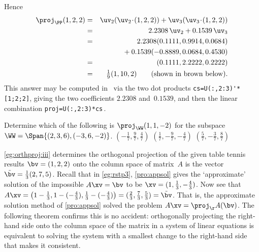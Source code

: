\begin{example}
\begin{enumerate}
\begin{solution}
\begin{center}\end{center}
Hence
\begin{eqnarray*}
\proj_\PP(1,2,2)
&=&\uv_2(\uv_2\cdot(1,2,2))+\uv_3(\uv_3\cdot(1,2,2))
\\&=&2.2308\,\uv_2+0.1539\,\uv_3
\\&=&2.2308(0.1111,0.9914,0.0684)
\\&&{}+0.1539(-0.8889,0.0684,0.4530)
\\&=&(0.1111,2.2222,0.2222)
\\&=&\tfrac19(1,10,2)
\qquad(\text{shown in brown below}).
\end{eqnarray*}
This answer may be computed in \script\ via the two dot products \verb|cs=U(:,2:3)'*[1;2;2]|, giving the two coefficients \(2.2308\) and~\(0.1539\), and then the linear combination \verb|proj=U(:,2:3)*cs|\,.
\begin{center}\end{center}
\end{solution}
\end{enumerate}
\end{example}



\begin{activity}
Determine which of the following is \(\proj_\WW(1,1,-2)\) for the subspace \(\WW=\Span\{(2,3,6), (-3,6,-2)\}\).
{\((-\frac17,\frac97,\frac47)\)}
{\((\frac17,-\frac97,-\frac47)\)}
{\((\frac57,-\frac37,\frac87)\)}
\end{activity}




\autoref{eg:orthproj:iii} determines the orthogonal projection of the given table tennis results \(\bv=(1,2,2)\) onto the column space of matrix~\(A\) is the vector \(\tilde\bv=\tfrac13(2,7,5)\).
Recall that in \autoref{eg:rstp3}, \autoref{pro:appsol} gives the `approximate' solution of the impossible \(A\xv=\bv\) to be \(\xv=(1,\frac13,-\frac43)\).
Now see that \(A\xv
=\big(1-\frac13,1-(-\frac43),\frac13-(-\frac43)\big)
=(\frac23,\frac73,\frac53)
=\tilde\bv\).
That is, the approximate solution method of \autoref{pro:appsol} solved the problem \(A\xv=\proj_\AA(\bv)\).
The following theorem confirms this is no accident: orthogonally projecting the right-hand side onto the column space of the matrix in a system of linear equations is equivalent to solving the system with a smallest change to the right-hand side that makes it consistent.


